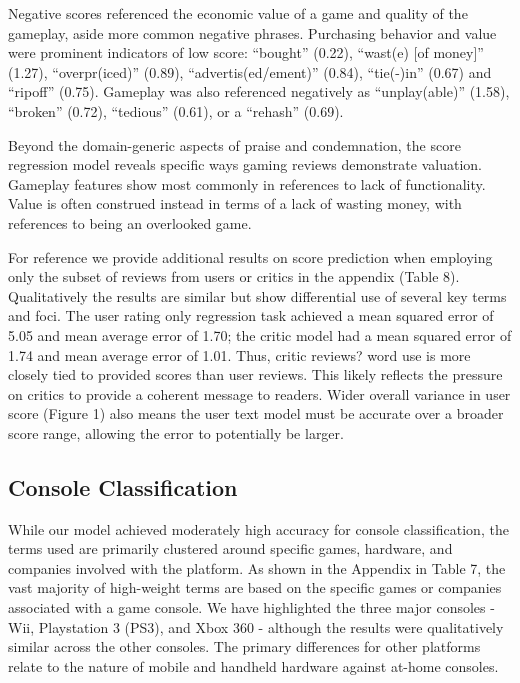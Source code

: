 \documentclass[letterpaper]{article}
\begin{document}
Negative scores referenced the economic value of a game and quality of the gameplay, aside more common negative phrases. Purchasing behavior and value were prominent indicators of low score: ``bought'' (0.22), ``wast(e) [of money]'' (1.27), ``overpr(iced)'' (0.89), ``advertis(ed/ement)'' (0.84), ``tie(-)in'' (0.67) and ``ripoff'' (0.75). Gameplay was also referenced negatively as ``unplay(able)'' (1.58), ``broken'' (0.72), ``tedious'' (0.61), or a ``rehash'' (0.69).

Beyond the domain-generic aspects of praise and condemnation, the score regression model reveals specific ways gaming reviews demonstrate valuation. Gameplay features show most commonly in references to lack of functionality. Value is often construed instead in terms of a lack of wasting money, with references to being an overlooked game.

For reference we provide additional results on score prediction when employing only the subset of reviews from users or critics in the appendix (Table 8). Qualitatively the results are similar but show differential use of several key terms and foci. The user rating only regression task achieved a mean squared error of 5.05 and mean average error of 1.70; the critic model had a mean squared error of 1.74 and mean average error of 1.01. Thus, critic reviews? word use is more closely tied to provided scores than user reviews. This likely reflects the pressure on critics to provide a coherent message to readers. Wider overall variance in user score (Figure 1) also means the user text model must be accurate over a broader score range, allowing the error to potentially be larger.

\subsection{Console Classification}
While our model achieved moderately high accuracy for console classification, the terms used are primarily clustered around specific games, hardware, and companies involved with the platform. As shown in the Appendix in Table 7, the vast majority of high-weight terms are based on the specific games or companies associated with a game console. We have highlighted the three major consoles - Wii, Playstation 3 (PS3), and Xbox 360 - although the results were qualitatively similar across the other consoles. The primary differences for other platforms relate to the nature of mobile and handheld hardware against at-home consoles.
\end{document}
